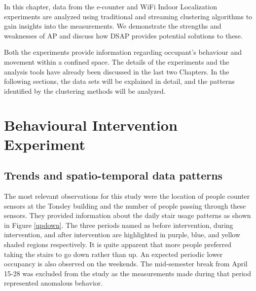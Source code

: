 In this chapter, data from the e-counter and WiFi Indoor Localization experiments are analyzed using traditional and streaming clustering algorithms to gain insights into the measurements. We demonstrate the strengths and weaknesses of AP and discuss how DSAP provides potential solutions to these.

Both the experiments provide information regarding occupant's behaviour and movement within a confined space. The details of the experiments and the analysis tools have already been discussed in the last two Chapters. In the following sections, the data sets will be explained in detail, and the patterns identified by the clustering methods will be analyzed.

 
\section{Behavioural Intervention Experiment} 

\subsection{Trends and spatio-temporal data patterns}


The most relevant observations for this study were the location of people counter sensors at the Tonsley building and the number of people passing through these sensors. They provided information about the daily stair usage patterns as shown in Figure \ref{updown}. The three periods named as before intervention, during intervention, and after intervention are highlighted in purple, blue, and yellow shaded regions respectively. It is quite apparent that more people preferred taking the stairs to go down rather than up. An expected periodic lower occupancy is also observed on the weekends. The mid-semester break from April 15-28 was excluded from the study as the measurements made during that period represented anomalous behavior. 

